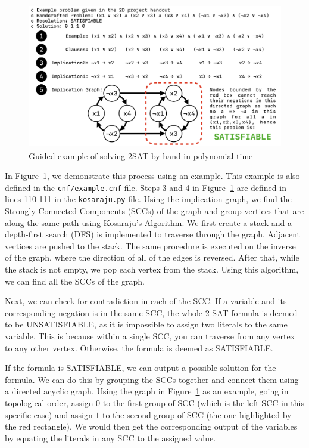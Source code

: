 \documentclass[11pt,fancychapters]{article}
\begin{document}
\vspace{4mm}

\begin{figure}[h]\label{fig}
\centering
\includegraphics[width=.9\textwidth]{diagrams/example_cnf_solved.png}
\caption{Guided example of solving 2SAT by hand in polynomial time}
\label{fig:example_problem}
\end{figure}

\vspace{4mm}

In Figure~\ref{fig:example_problem}, we demonstrate this process using an example. This example is also defined in the \texttt{cnf/example.cnf} file. Steps 3 and 4 in Figure~\ref{fig:example_problem} are defined in lines 110-111 in the \texttt{kosaraju.py} file. Using the implication graph, we find the Strongly-Connected Components (SCCs) of the graph and group vertices that are along the same path using Kosaraju's Algorithm. We first create a stack and a depth-first search (DFS) is implemented to traverse through the graph. Adjacent vertices are pushed to the stack. The same procedure is executed on the inverse of the graph, where the direction of all of the edges is reversed. After that, while the stack is not empty, we pop each vertex from the stack. Using this algorithm, we can find all the SCCs of the graph.\newline

Next, we can check for contradiction in each of the SCC. If a variable and its corresponding negation is in the same SCC, the whole 2-SAT formula is deemed to be UNSATISFIABLE, as it is impossible to assign two literals to the same variable. This is because within a single SCC, you can traverse from any vertex to any other vertex. Otherwise, the formula is deemed as SATISFIABLE.\newline

If the formula is SATISFIABLE, we can output a possible solution for the formula. We can do this by grouping the SCCs together and connect them using a directed acyclic graph. Using the graph in Figure~\ref{fig:example_problem} as an example, going in topological order, assign $0$ to the first group of SCC (which is the left SCC in this specific case) and assign $1$ to the second group of SCC (the one highlighted by the red rectangle). We would then get the corresponding output of the variables by equating the literals in any SCC to the assigned value.
\end{document}
